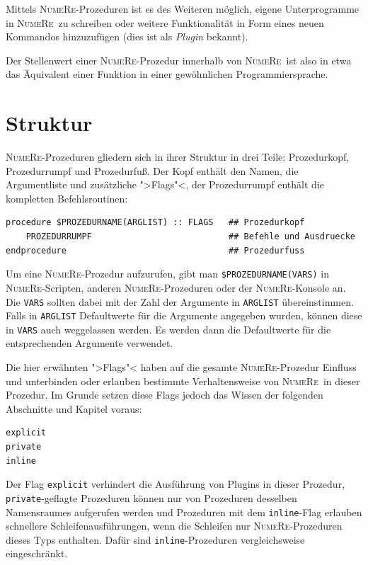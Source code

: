\documentclass[DIV=14,headsepline,footsepline]{scrbook}
\newcommand{\NR}{\textsc{Nu\-me\-Re}}
\begin{document}
				Mittels \NR-Prozeduren ist es des Weiteren möglich, eigene Unterprogramme in \NR\ zu schreiben oder weitere Funktionalität in Form eines neuen Kommandos hinzuzufügen (dies ist als \emph{Plugin} bekannt).
				
				Der Stellenwert einer \NR-Prozedur innerhalb von \NR\ ist also in etwa das Äquivalent einer Funktion in einer gewöhnlichen Programmiersprache.
				
			\section{Struktur}
				\NR-Prozeduren gliedern sich in ihrer Struktur in drei Teile: Prozedurkopf, Prozedurrumpf und Prozedurfuß. Der Kopf enthält den Namen, die Argumentliste und zusätzliche ">Flags"<, der Prozedurrumpf enthält die kompletten Befehlsroutinen:
				\begin{lstlisting}
procedure $PROZEDURNAME(ARGLIST) :: FLAGS   ## Prozedurkopf
	PROZEDURRUMPF                           ## Befehle und Ausdruecke
endprocedure                                ## Prozedurfuss
				\end{lstlisting}
				Um eine \NR-Prozedur aufzurufen, gibt man \lstinline+$PROZEDURNAME(VARS)+ in \NR-Scrip\-ten, anderen \NR-Prozeduren oder der \NR-Konsole an. Die \lstinline+VARS+ sollten dabei mit der Zahl der Argumente in \lstinline+ARGLIST+ übereinstimmen. Falls in \lstinline+ARGLIST+ Defaultwerte für die Argumente angegeben wurden, können diese in \lstinline+VARS+ auch weggelassen werden. Es werden dann die Defaultwerte für die entsprechenden Argumente verwendet.
				
				Die hier erwähnten ">Flags"< haben auf die gesamte \NR-Prozedur Einfluss und unterbinden oder erlauben bestimmte Verhaltensweise von \NR\ in dieser Prozedur. Im Grunde setzen diese Flags jedoch das Wissen der folgenden Abschnitte und Kapitel voraus:
				\begin{lstlisting}
explicit
private
inline
				\end{lstlisting}
				Der Flag \lstinline+explicit+ verhindert die Ausführung von Plugins in dieser Prozedur, \lstinline+private+-geflagte Prozeduren können nur von Prozeduren desselben Namensraumes aufgerufen werden und Prozeduren mit dem \lstinline+inline+-Flag erlauben schnellere Schleifenausführungen, wenn die Schleifen nur \NR-Pro\-ze\-du\-ren dieses Typs enthalten. Dafür sind \lstinline+inline+-Pro\-ze\-du\-ren vergleichsweise eingeschränkt.
				
\end{document}
